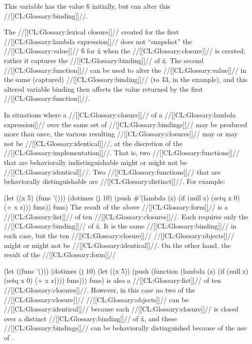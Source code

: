 This variable has the value \f{6}
initially, but  can alter this //[[CL:Glossary:binding]]//.








The //[[CL:Glossary:lexical closure]]// created for the first 
//[[CL:Glossary:lambda expression]]// does not ``snapshot'' the //[[CL:Glossary:value]]// \f{6} for \f{x}
when the //[[CL:Glossary:closure]]// is created; rather it captures the //[[CL:Glossary:binding]]// of \f{x}.
The second //[[CL:Glossary:function]]// can be used to alter the //[[CL:Glossary:value]]// in the same (captured)
//[[CL:Glossary:binding]]// (to \f{43}, in the example), and
this altered variable binding then affects the value returned by the first //[[CL:Glossary:function]]//.

                     

In situations where a //[[CL:Glossary:closure]]// of a 
//[[CL:Glossary:lambda expression]]// over the same set of //[[CL:Glossary:bindings]]// may be
produced more than once, the various resulting //[[CL:Glossary:closures]]// may
or may not be //[[CL:Glossary:identical]]//, at the discretion of the //[[CL:Glossary:implementation]]//.
That is, two //[[CL:Glossary:functions]]// that are behaviorally
indistinguishable might or might not be //[[CL:Glossary:identical]]//.
Two //[[CL:Glossary:functions]]// that are behaviorally distinguishable are //[[CL:Glossary:distinct]]//.
For example:
 
\code
 (let ((x 5) (funs '()))
   (dotimes (j 10)                          
     (push #'(lambda (z)                        
               (if (null z) (setq x 0) (+ x z)))
           funs))
   funs)
\endcode
The result of the above //[[CL:Glossary:form]]// is a //[[CL:Glossary:list]]// of ten //[[CL:Glossary:closures]]//.
Each requires only the //[[CL:Glossary:binding]]// of \f{x}.
It is the same //[[CL:Glossary:binding]]// in each case, 
but the ten //[[CL:Glossary:closure]]// //[[CL:Glossary:objects]]// might or might not be //[[CL:Glossary:identical]]//.
On the other hand, the result of the //[[CL:Glossary:form]]//
 
\code
 (let ((funs '()))     
   (dotimes (j 10)
     (let ((x 5))
       (push (function (lambda (z)
                        (if (null z) (setq x 0) (+ x z))))
             funs)))
  funs)
\endcode
is also a //[[CL:Glossary:list]]// of ten //[[CL:Glossary:closures]]//.
However, in this case no two of the //[[CL:Glossary:closure]]// //[[CL:Glossary:objects]]// can
be //[[CL:Glossary:identical]]// because each //[[CL:Glossary:closure]]// is closed over a distinct
//[[CL:Glossary:binding]]// of \f{x}, and these //[[CL:Glossary:bindings]]// can be behaviorally
distinguished because of the use of .
 

